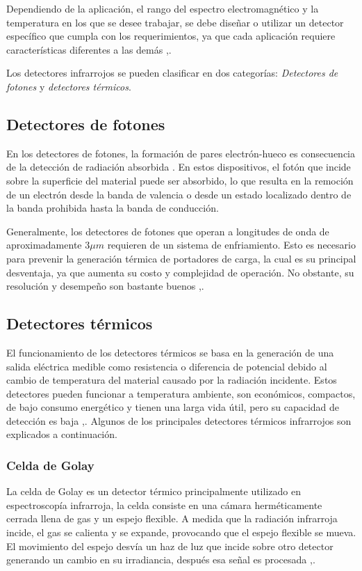     Dependiendo de la aplicación, el rango del espectro electromagnético y la temperatura en los que se desee trabajar, se debe diseñar o utilizar un detector específico que cumpla con los requerimientos, ya que cada aplicación requiere características diferentes a las demás \cite{Rogalski},\cite{BlancoMDA}.
    
    Los detectores infrarrojos se pueden clasificar en dos categorías: \textit{Detectores de fotones} y \textit{detectores térmicos}.
    
		\subsection{Detectores de fotones}
		En los detectores de fotones, la formación de pares electrón-hueco es consecuencia de la detección de radiación absorbida \cite{BlancoMDA}. En estos dispositivos, el fotón que incide sobre la superficie del material puede ser absorbido, lo que resulta en la remoción de un electrón desde la banda de valencia o desde un estado localizado dentro de la banda prohibida hasta la banda de conducción.

Generalmente, los detectores de fotones que operan a longitudes de onda de aproximadamente 3$\mu m$ requieren de un sistema de enfriamiento. Esto es necesario para prevenir la generación térmica de portadores de carga, la cual es su principal desventaja, ya que aumenta su costo y complejidad de operación. No obstante, su resolución y desempeño son bastante buenos \cite{Vincent},\cite{BlancoMDA}. 
		   
		\subsection{Detectores térmicos}
		El funcionamiento de los detectores térmicos se basa en la generación de una salida eléctrica medible como resistencia o diferencia de potencial debido al cambio de temperatura del material causado por la radiación incidente.
Estos detectores pueden funcionar a temperatura ambiente, son económicos, compactos, de bajo consumo energético y tienen una larga vida útil, pero su capacidad de detección es baja \cite{Rogalski},\cite{BlancoMDA}.
Algunos de los principales detectores térmicos infrarrojos son explicados a continuación.
		
		\subsubsection{Celda de Golay}
		La celda de Golay es un detector térmico principalmente utilizado en espectroscopía infrarroja, la celda consiste en una cámara herméticamente cerrada llena de gas y un espejo flexible. A medida que la radiación infrarroja incide, el gas se calienta y se expande, provocando que el espejo flexible se mueva. El movimiento del espejo desvía un haz de luz que incide sobre otro detector generando un cambio en su irradiancia, después esa señal es procesada \cite{Vincent},\cite{BlancoMDA}.
